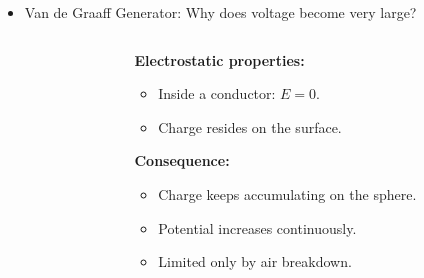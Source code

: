 \documentclass[t,aspectratio=169]{beamer}
\begin{document}
\begin{frame}
\begin{itemize}
\begin{columns}
\begin{column}{0.3\textwidth}
\end{column}

\begin{column}{0.65\textwidth}

\textbf{Steps:}
\begin{enumerate}
\item A high voltage source creates charge at the lower comb.
\item The belt picks up charge by corona discharge.
\item The belt carries charge upward.
\item At the top, charge is transferred to the sphere.
\end{enumerate}
\end{column}

\end{columns}


\pagebreak
\item Van de Graaff Generator: Why does voltage become very large?

\begin{columns}

\begin{column}{0.5\textwidth}
\vfill
\centering
{}
\end{column}

\begin{column}{0.5\textwidth}
\textbf{Electrostatic properties:}
\begin{itemize}
\item Inside a conductor: $E = 0$.
\item Charge resides on the surface.
\end{itemize}

\textbf{Consequence:}
\begin{itemize}
\item Charge keeps accumulating on the sphere.
\item Potential increases continuously.
\item Limited only by air breakdown.
\end{itemize}
\end{column}


\end{columns}
\end{itemize}
\end{frame}
\end{document}

